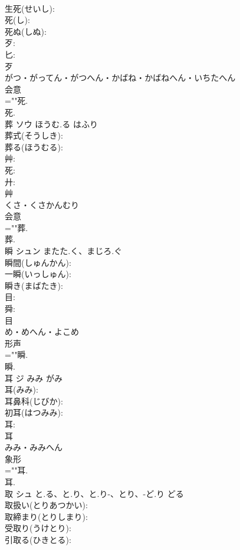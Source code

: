 \documentclass[8pt]{extreport}
\begin{document}
\begin{CJK}{UTF8}{min}
\\	生死(せいし): 
\\	死(し): 
\\	死ぬ(しぬ): 
\\	歹: 
\\	匕: 
\\	歹	
\\	がつ・がってん・がつへん・かばね・かばねへん・いちたへん	
\\	会意 
\\	=""死.
\\	死.
\\	葬	ソウ	ほうむ.る	はふり	
\\	葬式(そうしき): 
\\	葬る(ほうむる): 
\\	艸: 
\\	死: 
\\	廾: 
\\	艸	
\\	くさ・くさかんむり	
\\	会意 
\\	=""葬.
\\	葬.
\\	瞬	シュン	またた.く、まじろ.ぐ		
\\	瞬間(しゅんかん): 
\\	一瞬(いっしゅん): 
\\	瞬き(まばたき): 
\\	目: 
\\	舜: 
\\	目	
\\	め・めへん・よこめ	
\\	形声 
\\	=""瞬.
\\	瞬.
\\	耳	ジ	みみ	がみ	
\\	耳(みみ): 
\\	耳鼻科(じびか): 
\\	初耳(はつみみ): 
\\	耳: 
\\	耳	
\\	みみ・みみへん	
\\	象形 
\\	=""耳.
\\	耳.
\\	取	シュ	と.る、と.り、と.り-、とり、-ど.り	どる	
\\	取扱い(とりあつかい): 
\\	取締まり(とりしまり): 
\\	受取り(うけとり): 
\\	引取る(ひきとる): 

\end{CJK}
\end{document}
